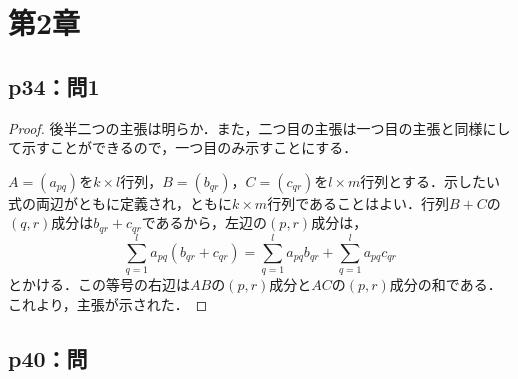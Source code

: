 \documentclass[uplatex,dvipdfmx,a4paper,11pt,fleqn]{jsarticle}
\begin{document}
\section*{第2章}


\subsection*{p34：問1}

\begin{tleftbar}
\begin{proof}
後半二つの主張は明らか．また，二つ目の主張は一つ目の主張と同様にして示すことができるので，一つ目のみ示すことにする．


$A=(a_{pq})$を$k \times l$行列，$B= (b_{qr})$，$C=(c_{qr})$を$l \times m$行列とする．示したい式の両辺がともに定義され，ともに$k \times m$行列であることはよい．行列$B+C$の$(q,r)$成分は$b_{qr}+c_{qr}$であるから，左辺の$(p,r)$成分は，
\[
\sum_{q=1}^{l}a_{pq}\left(b_{qr}+c_{qr}\right)=\sum_{q=1}^{l}a_{pq}b_{qr}+\sum_{q=1}^{l}a_{pq}c_{qr}
\]
とかける．この等号の右辺は$AB$の$(p,r)$成分と$AC$の$(p,r)$成分の和である．これより，主張が示された．
\end{proof}
\end{tleftbar}



\subsection*{p40：問}
\end{document}

